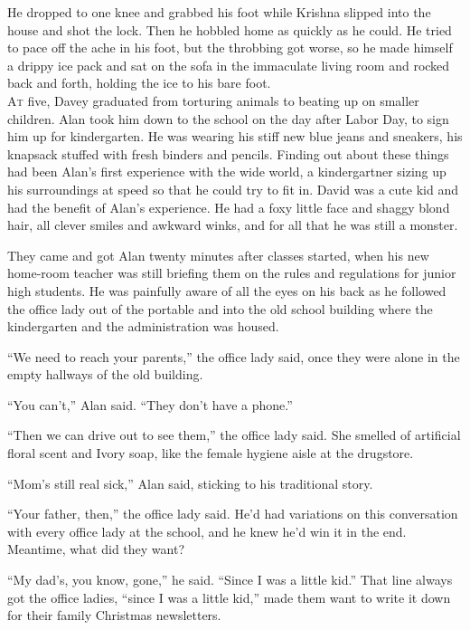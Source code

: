 He dropped to one knee and grabbed his foot while Krishna slipped into
the house and shot the lock.  Then he hobbled home as quickly as he
could.  He tried to pace off the ache in his foot, but the throbbing
got worse, so he made himself a drippy ice pack and sat on the sofa in
the immaculate living room and rocked back and forth, holding the ice
to his bare foot.
\\
\lettrine[lines=3, lhang=.5, nindent=0pt, findent=2pt]{A}{t} five, Davey graduated from torturing animals to beating up on
smaller children.  Alan took him down to the school on the day after
Labor Day, to sign him up for kindergarten.  He was wearing his stiff
new blue jeans and sneakers, his knapsack stuffed with fresh binders
and pencils.  Finding out about these things had been Alan's first
experience with the wide world, a kindergartner sizing up his
surroundings at speed so that he could try to fit in.  David was a
cute kid and had the benefit of Alan's experience.  He had a foxy
little face and shaggy blond hair, all clever smiles and awkward
winks, and for all that he was still a monster.

They came and got Alan twenty minutes after classes started, when his
new home-room teacher was still briefing them on the rules and
regulations for junior high students.  He was painfully aware of all
the eyes on his back as he followed the office lady out of the
portable and into the old school building where the kindergarten and
the administration was housed.

``We need to reach your parents,'' the office lady said, once they
were alone in the empty hallways of the old building.

``You can't,'' Alan said.  ``They don't have a phone.''

``Then we can drive out to see them,'' the office lady said.  She
smelled of artificial floral scent and Ivory soap, like the female
hygiene aisle at the drugstore.

``Mom's still real sick,'' Alan said, sticking to his traditional
story.

``Your father, then,'' the office lady said.  He'd had variations on
this conversation with every office lady at the school, and he knew
he'd win it in the end.  Meantime, what did they want?

``My dad's, you know, gone,'' he said.  ``Since I was a little kid.''
That line always got the office ladies, ``since I was a little kid,''
made them want to write it down for their family Christmas
newsletters.

